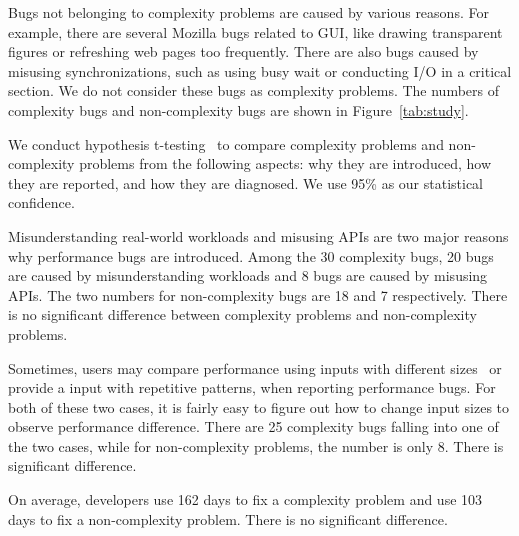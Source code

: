 Bugs not belonging to complexity problems are caused by various reasons.
For example, there are several Mozilla bugs related to GUI, 
like drawing transparent figures or refreshing web pages too frequently. 
There are also bugs caused by misusing synchronizations, 
such as using busy wait or conducting I/O in a critical section. 
We do not consider these bugs as complexity problems.
The numbers of complexity bugs and non-complexity bugs are shown in Figure~\ref{tab:study}.


We conduct hypothesis t-testing~\cite{ttest} 
to compare complexity problems and non-complexity 
problems from the following aspects: why they are introduced, 
how they are reported, and how they are diagnosed. 
We use 95\% as our statistical confidence. 


Misunderstanding real-world workloads and misusing APIs
are two major reasons why performance bugs are introduced. 
Among the 30 complexity bugs, 20 bugs are caused 
by misunderstanding workloads
and 8 bugs are caused by misusing APIs. 
The two numbers for non-complexity bugs are 18 and 7 respectively. 
There is no significant difference between complexity 
problems and non-complexity problems. 


Sometimes, users may compare performance using inputs with different 
sizes~\cite{SongOOPSLA2014} or provide a input with repetitive patterns,  
when reporting performance bugs. 
For both of these two cases, 
it is fairly easy to figure out how to change input sizes to observe performance difference. 
There are 25 complexity bugs falling into one of the two cases, 
while for non-complexity problems, the number is only 8.
There is significant difference. 

On average, developers use 162 days to fix a 
complexity problem and use 103 days to fix a non-complexity problem. 
There is no significant difference. 
